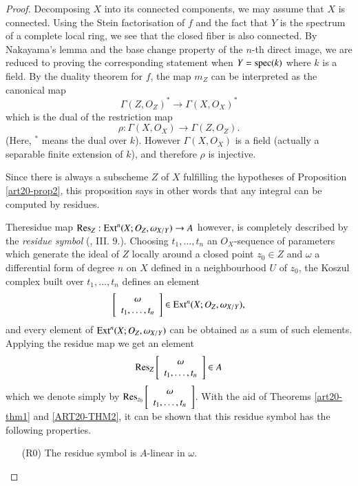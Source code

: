 \begin{proof}
Decomposing $X$ into its connected components, we may assume that $X$ is connected. Using the Stein factorisation of $f$ and the fact that $Y$ is the spectrum of a complete local ring, we see that the closed fiber is also connected. By Nakayama's lemma and the base change property of the $n$-th direct image, we are reduced to proving the corresponding statement when $Y=\operatorname{\mathrm{spec}} (k)$ where $k$ is a field. By the duality theorem for $f$, the map $m_{Z}$ can be interpreted as the canonical map
$$
\Gamma(Z,O_{Z})^{*}\to \Gamma(X,O_{X})^{*}
$$
which is the dual of the restriction map
$$
\rho :\Gamma(X,O_{X})\to \Gamma(Z,O_{Z}).
$$
(Here, $^*$ means the dual over $k$). However $\Gamma(X,O_{X})$ is a field (actually a separable finite extension of $k$), and therefore $\rho$ is injective.

Since there is always a subscheme $Z$ of $X$ fulfilling the hypotheses of Proposition \ref{art20-prop2}, this proposition says in other words that any integral can be computed by residues.

The\pageoriginale residue map $\operatorname{\mathrm{Res}}_{Z}:\operatorname{\mathrm{Ext}}^{n}(X;O_{Z},\omega_{X/Y})\to A$ however, is completely described by the {\em residue symbol} (\cite{art20-key1}, III. 9.). Choosing $t_{1},\ldots,t_{n}$ an $O_{X}$-sequence of parameters which generate the ideal of $Z$ locally around a closed point $z_{0}\in Z$ and $\omega$ a differential form of degree $n$ on $X$ defined in a neighbourhood $U$ of $z_{0}$, the Koszul complex built over $t_{1},\ldots,t_{n}$ defines an element
$$
\left[\begin{array}{c}
\omega\\
t_{1},\ldots,t_{n}
\end{array}\right]
\in \operatorname{\mathrm{Ext}}^{n}(X;O_{Z},\omega_{X/Y}),
$$
and every element of $\operatorname{\mathrm{Ext}}^{n}(X;O_{Z},\omega_{X/Y})$ can be obtained as a sum of such elements. Applying the residue map we get an element 
$$
\operatorname{\mathrm{Res}}_{Z}\left[\begin{array}{c} \omega\\ t_{1},\ldots,t_{n}\end{array}\right]\in A
$$ 
which we denote simply by $\operatorname{\mathrm{Res}}_{z_{0}}\left[\begin{array}{c} \omega\\ t_{1},\ldots,t_{n}\end{array}\right]$. With the aid of Theorems \ref{art20-thm1} and \ref{ART20-THM2}, it can be shown that this residue symbol has the following properties.
\begin{itemize}
\item[(R0)] The residue symbol is $A$-linear in $\omega$.


\end{itemize}
\end{proof}
